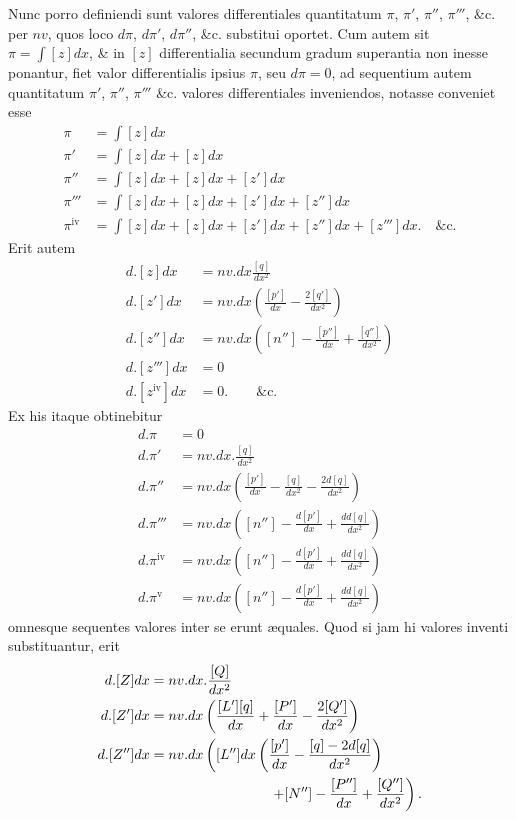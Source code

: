 Nunc porro definiendi sunt valores differentiales quantitatum $\pi$, $\pi'$, $\pi''$, $\pi'''$, \&c. per $nv$, quos loco $d\pi$, $d\pi'$, $d\pi''$, \&c. substitui oportet. Cum autem sit $\pi=\int[z]dx$, \& in $[z]$ differentialia secundum gradum superantia non inesse ponantur, fiet valor differentialis ipsius $\pi$, seu $d\pi=0$, ad sequentium autem quantitatum $\pi'$, $\pi''$, $\pi'''$ \&c. valores differentiales inveniendos, notasse conveniet esse
\[
\begin{aligned}
\pi&=\int[z]dx\\
\pi'&=\int[z]dx+[z]dx\\
\pi''&=\int[z]dx+[z]dx+[z']dx\\
\pi'''&=\int[z]dx+[z]dx+[z']dx+[z'']dx\\
\pi^{\mathrm{iv}}&=\int[z]dx+[z]dx+[z']dx+[z'']dx+[z''']dx.\quad\text{\&c.}
\end{aligned}
\]
Erit autem
\[
\begin{aligned}
d.[z]dx&=nv.dx\frac{[q]}{dx^2}\\
d.[z']dx&=nv.dx\left(\frac{[p']}{dx}-\frac{2[q']}{dx^2}\right)\\
d.[z'']dx&=nv.dx\left([n'']-\frac{[p'']}{dx}+\frac{[q'']}{dx^2}\right)\\
d.[z''']dx&=0\\
d.[z^{\mathrm{iv}}]dx&=0.\qquad\text{\&c.}
\end{aligned}
\]
Ex his itaque obtinebitur
\[
\begin{aligned}
d.\pi&=0\\
d.\pi'&=nv.dx.\frac{[q]}{dx^2}\\
d.\pi''&=nv.dx\left(\frac{[p']}{dx}-\frac{[q]}{dx^2}-\frac{2d[q]}{dx^2}\right)\\
d.\pi'''&=nv.dx\left([n'']-\frac{d[p']}{dx}+\frac{dd[q]}{dx^2}\right)\\
d.\pi^{\mathrm{iv}}&=nv.dx\left([n'']-\frac{d[p']}{dx}+\frac{dd[q]}{dx^2}\right)\\
d.\pi^{\mathrm{v}}&=nv.dx\left([n'']-\frac{d[p']}{dx}+\frac{dd[q]}{dx^2}\right)
\end{aligned}
\]
omnesque sequentes valores inter se erunt æquales. Quod si jam hi valores inventi substituantur, erit
\[
\begin{aligned}
d.[Z]dx&=nv.dx.\frac{[Q]}{dx^2}\\
d.[Z']dx&=nv.dx\left(\frac{[L'][q]}{dx}+\frac{[P']}{dx}-\frac{2[Q']}{dx^2}\right)\\
d.[Z'']dx&=nv.dx\left([L'']dx\left(\frac{[p']}{dx}-\frac{[q]-2d[q]}{dx^2}\right)\right.\\
&\hspace{30mm}\left.+[N'']-\frac{[P'']}{dx}+\frac{[Q'']}{dx^2}\right).
\end{aligned}
\]

